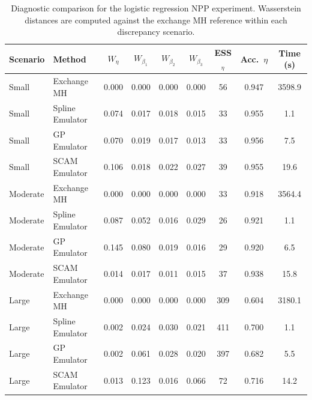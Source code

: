 \begin{table}[ht]
  \centering
  \begin{tabular}{llccccccc}
  \hline
  Scenario & Method & $W_\eta$ & $W_{\beta_1}$ & $W_{\beta_2}$ & $W_{\beta_3}$ & ESS$_\eta$ & Acc.\ $\eta$ & Time (s) \\
  \hline
  Small & Exchange MH & 0.000 & 0.000 & 0.000 & 0.000 & 56 & 0.947 & 3598.9 \\
  Small & Spline Emulator & 0.074 & 0.017 & 0.018 & 0.015 & 33 & 0.955 & 1.1 \\
  Small & GP Emulator & 0.070 & 0.019 & 0.017 & 0.013 & 33 & 0.956 & 7.5 \\
  Small & SCAM Emulator & 0.106 & 0.018 & 0.022 & 0.027 & 39 & 0.955 & 19.6 \\
  \hline
  Moderate & Exchange MH & 0.000 & 0.000 & 0.000 & 0.000 & 33 & 0.918 & 3564.4 \\
  Moderate & Spline Emulator & 0.087 & 0.052 & 0.016 & 0.029 & 26 & 0.921 & 1.1 \\
  Moderate & GP Emulator & 0.145 & 0.080 & 0.019 & 0.016 & 29 & 0.920 & 6.5 \\
  Moderate & SCAM Emulator & 0.014 & 0.017 & 0.011 & 0.015 & 37 & 0.938 & 15.8 \\
  \hline
  Large & Exchange MH & 0.000 & 0.000 & 0.000 & 0.000 & 309 & 0.604 & 3180.1 \\
  Large & Spline Emulator & 0.002 & 0.024 & 0.030 & 0.021 & 411 & 0.700 & 1.1 \\
  Large & GP Emulator & 0.002 & 0.061 & 0.028 & 0.020 & 397 & 0.682 & 5.5 \\
  Large & SCAM Emulator & 0.013 & 0.123 & 0.016 & 0.066 & 72 & 0.716 & 14.2 \\
  \hline
  \end{tabular}
  \caption{Diagnostic comparison for the logistic regression NPP experiment. Wasserstein distances are computed against the exchange MH reference within each discrepancy scenario.}
  \label{tab:logistic-surrogate-diagnostics}
\end{table}
